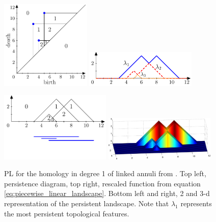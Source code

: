 \documentclass{article}
\begin{document}
\begin{figure}[htb]
  \centering
  \begin{minipage}{60mm}
    \includegraphics[width=43mm]{figures/persistence_landscape_bubenik_paper/landscapes-figure7.pdf} %
    \includegraphics[width=53mm]{figures/persistence_landscape_bubenik_paper/landscapes-figure9.pdf}
  \end{minipage}
  \begin{minipage}{60mm}
    \vspace{5ex}
    \includegraphics[width=53mm]{figures/persistence_landscape_bubenik_paper/landscapes-figure8.pdf} %
    \includegraphics[width=53mm]{figures/persistence_landscape_bubenik_paper/paper3dlandscape.png}
  \end{minipage}
  \vspace{5ex}
  \caption{PL for the homology in degree 1 of linked annuli from \citep{bubenik2015statistical}. Top
    left, persistence diagram, top right, rescaled function from equation
    \ref{eq:piecewise_linear_landscape}. Bottom left and right, 2 and 3-d representation of the
    persistent landscape. Note that $\lambda_1$ represents the most persistent topological features.}
  \label{fig:pl_bubenik}
\end{figure}
\end{document}
